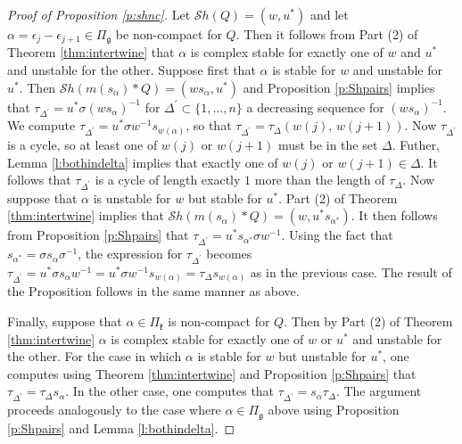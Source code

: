 \documentclass[12pt]{amsart}
\numberwithin{equation}{section}
\newcommand{\fk}{\mbox{${\mathfrak k}$}}
\newcommand{\fg}{\mbox{${\mathfrak g}$}}
\newcommand{\eps}{\epsilon}
\newcommand{\ms}{m(s_{\alpha})}
\newcommand{\Sh}{\mathcal{S}h}
\begin{document}
\begin{proof}[Proof of Proposition \ref{p:shnc}]
Let $\Sh(Q)=(w,u^{*})$ and let $\alpha=\eps_{j}-\eps_{j+1}\in\Pi_{\fg}$ be non-compact   
for $Q$. Then it follows from Part (2) of Theorem \ref{thm:intertwine} that $\alpha$ is complex stable 
for exactly one of $w$ and $u^{*}$ and unstable for the other.  Suppose first that 
$\alpha$ is stable for $w$ and unstable for $u^{*}$.  Then $\Sh(\ms*Q)=(ws_{\alpha}, u^{*})$ and 
Proposition \ref{p:Shpairs} implies that $\tau_{\Delta^{\prime}}=u^{*}\sigma(w s_{\alpha})^{-1}$ for
$\Delta^{\prime}\subset\{1,\dots, n\}$ a decreasing sequence for $(ws_{\alpha})^{-1}$.  We compute 
$\tau_{\Delta^{\prime}}=u^{*}\sigma w^{-1} s_{w(\alpha)}$, so that 
$\tau_{\Delta^{\prime}}=\tau_{\Delta}(w(j),\, w(j+1))$.  
Now $\tau_{\Delta^{\prime}}$ is a cycle, so at least one of $w(j)$ or $w(j+1)$ must be in 
the set $\Delta$.  Futher, Lemma \ref{l:bothindelta} implies that exactly one of $w(j)$ or $w(j+1)\in \Delta$.  
It follows that $\tau_{\Delta^{\prime}}$ is a cycle of length exactly $1$ more than the length of $\tau_{\Delta}$.  
Now suppose that $\alpha$ is unstable for $w$ but stable for $u^{*}$.  Part (2) of Theorem \ref{thm:intertwine} implies that $\Sh(\ms*Q)=(w, u^{*}s_{\alpha^{*}})$.  It then follows from Proposition \ref{p:Shpairs} that $\tau_{\Delta^{\prime}}=u^{*}s_{\alpha^{*}}\sigma w^{-1}$.  Using the fact that $s_{\alpha^{*}}=\sigma s_{\alpha} \sigma^{-1}$, the expression for $\tau_{\Delta^{\prime}}$ becomes 
$\tau_{\Delta^{\prime}}=u^{*}\sigma s_{\alpha}w^{-1}=u^{*}\sigma w^{-1} s_{w(\alpha)}=\tau_{\Delta} s_{w(\alpha)}$ as in the previous case.   The result of the Proposition follows in the same manner as above.  

Finally, suppose that $\alpha\in\Pi_{\fk}$ is non-compact   for $Q$.  Then by Part (2) of Theorem \ref{thm:intertwine} 
$\alpha$ is complex stable for exactly one of $w$ or $u^{*}$ and unstable for the other. 
For the case in which $\alpha$ is stable for $w$ but unstable for $u^{*}$, one computes using Theorem \ref{thm:intertwine} and Proposition \ref{p:Shpairs} that 
$\tau_{\Delta^{\prime}}=\tau_{\Delta}s_{\alpha}$.  In the other case, one computes that $\tau_{\Delta^{\prime}}=s_{\alpha}\tau_{\Delta}$.  The argument proceeds analogously to the case where $\alpha\in\Pi_{\fg}$ above using Proposition \ref{p:Shpairs} and Lemma \ref{l:bothindelta}.%

\end{proof}
\end{document}
